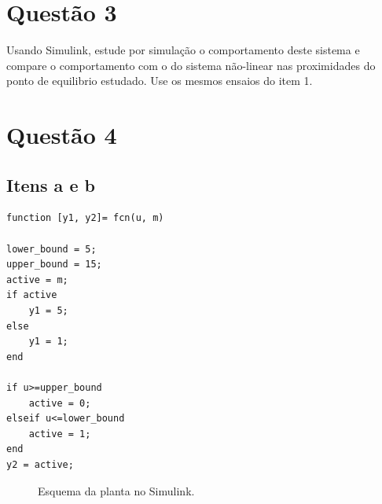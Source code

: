 \documentclass[11pt]{article}
\begin{document}
\section{Questão 3}
Usando Simulink, estude por simulação o comportamento deste sistema e compare o comportamento
com o do sistema não-linear nas proximidades do ponto de equilibrio estudado. Use os mesmos ensaios
do item 1.

\section{Questão 4}
\subsection{Itens a e b}
\begin{lstlisting}[caption={Código usado para controlar a planta},captionpos=b]
function [y1, y2]= fcn(u, m)

lower_bound = 5;
upper_bound = 15;
active = m;
if active
    y1 = 5;
else
    y1 = 1;
end

if u>=upper_bound
    active = 0;
elseif u<=lower_bound
    active = 1;
end
y2 = active;
\end{lstlisting}

\begin{figure}[!htb]
        \caption{\label{fig:my-label} Esquema da planta no Simulink.}
      \end{figure}
\end{document}
